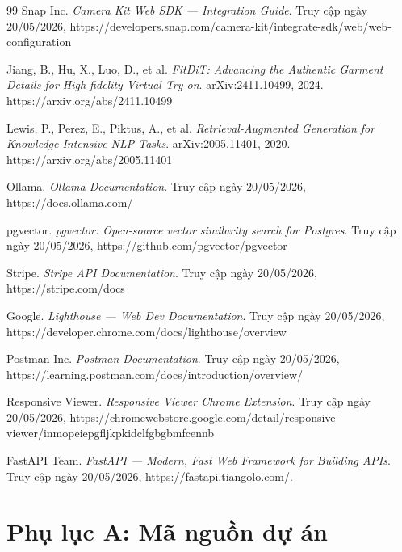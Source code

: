 \documentclass[a4paper,13pt]{report}
\begin{document}
\begin{thebibliography}{99}
Snap Inc. \textit{Camera Kit Web SDK --- Integration Guide}.
Truy cập ngày 20/05/2026,
https://developers.snap.com/camera-kit/integrate-sdk/web/web-configuration

Jiang, B., Hu, X., Luo, D., et al.
\textit{FitDiT: Advancing the Authentic Garment Details for
High-fidelity Virtual Try-on}.
arXiv:2411.10499, 2024.
https://arxiv.org/abs/2411.10499

Lewis, P., Perez, E., Piktus, A., et al.
\textit{Retrieval-Augmented Generation for Knowledge-Intensive NLP Tasks}.
arXiv:2005.11401, 2020.
https://arxiv.org/abs/2005.11401

Ollama. \textit{Ollama Documentation}.
Truy cập ngày 20/05/2026,
https://docs.ollama.com/

pgvector. \textit{pgvector: Open-source vector similarity search for Postgres}.
Truy cập ngày 20/05/2026,
https://github.com/pgvector/pgvector

Stripe. \textit{Stripe API Documentation}.
Truy cập ngày 20/05/2026,
https://stripe.com/docs

Google. \textit{Lighthouse --- Web Dev Documentation}.
Truy cập ngày 20/05/2026,
https://developer.chrome.com/docs/lighthouse/overview

Postman Inc. \textit{Postman Documentation}.
Truy cập ngày 20/05/2026,
https://learning.postman.com/docs/introduction/overview/

Responsive Viewer. \textit{Responsive Viewer Chrome Extension}.
Truy cập ngày 20/05/2026,
https://chromewebstore.google.com/detail/responsive-viewer/inmopeiepgfljkpkidclfgbgbmfcennb

FastAPI Team. \textit{FastAPI --- Modern, Fast Web Framework for Building APIs}.
Truy cập ngày 20/05/2026,
https://fastapi.tiangolo.com/.

\end{thebibliography}

\clearpage
\appendix
\renewcommand{\thechapter}{\Alph{chapter}}

\chapter*{Phụ lục A: Mã nguồn dự án}

\end{document}
